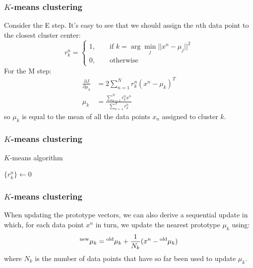 \documentclass{beamer}
\begin{document}
\begin{frame}
    \frametitle{$K$-means clustering}
    Consider the E step. It's easy to see that we should assign the $n$th data point to the closest cluster center:
    \begin{equation*}
        r^{n}_{k}=\begin{cases}
            1,\qquad\textrm{if }k=\arg\min_{j}||x^{n}-\mu_{j}||^{2} \\
            0,\qquad\textrm{otherwise}
        \end{cases}
    \end{equation*}
    For the M step:
    \begin{align*}
        \frac{\partial{}J}{\partial{}\mu_{k}}&=2\sum_{n=1}^{N}r^{n}_{k}(x^{n}-\mu_{k})^{T} \\
        \mu_{k}&=\frac{\sum_{n=1}^{N}r^{n}_{k}x^{n}}{\sum_{n=1}^{N}r^{n}_{k}}
    \end{align*}
    so $\mu_{k}$ is equal to the mean of all the data points $x_{n}$ assigned to cluster $k$.
\end{frame}

\begin{frame}
    \frametitle{$K$-means clustering}
    \begin{algorithm}[H]
        \caption{$K$-means algorithm}
        $\{r^{n}_{k}\}\gets{}0$\;
        \;
    \end{algorithm}
\end{frame}

\begin{frame}
    \frametitle{$K$-means clustering}
    When updating the prototype vectors, we can also derive a sequential update in which, for each data point $x^{n}$ in turn, we update the nearest prototype $\mu_{k}$ using:
    \begin{equation*}
        \prescript{\textrm{new}}{}{\mu}_{k}=\prescript{\textrm{old}}{}{\mu}_{k}+\frac{1}{N_{k}}(x^{n}-\prescript{\textrm{old}}{}{\mu}_{k})
    \end{equation*}
    where $N_{k}$ is the number of data points that have so far been used to update $\mu_{k}$.
\end{frame}
\end{document}
